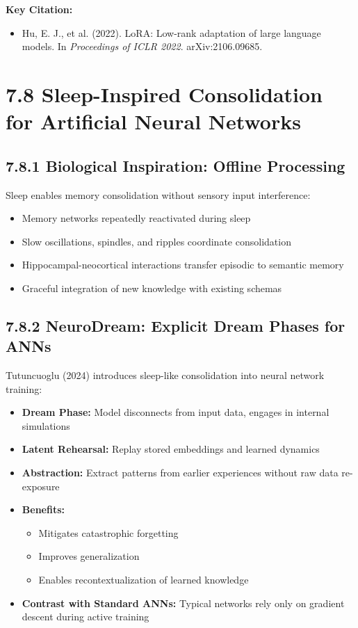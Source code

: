 \documentclass[11pt,letterpaper]{article}
\begin{document}
\textbf{Key Citation:}
\begin{itemize}[leftmargin=*]
    \item Hu, E. J., et al. (2022). LoRA: Low-rank adaptation of large language models. In \textit{Proceedings of ICLR 2022}. arXiv:2106.09685.
\end{itemize}

\section{\color{garnet}7.8 Sleep-Inspired Consolidation for Artificial Neural Networks}

\subsection{7.8.1 Biological Inspiration: Offline Processing}

Sleep enables memory consolidation without sensory input interference:

\begin{itemize}[leftmargin=*]
    \item Memory networks repeatedly reactivated during sleep
    \item Slow oscillations, spindles, and ripples coordinate consolidation
    \item Hippocampal-neocortical interactions transfer episodic to semantic memory
    \item Graceful integration of new knowledge with existing schemas
\end{itemize}

\subsection{7.8.2 NeuroDream: Explicit Dream Phases for ANNs}

Tutuncuoglu (2024) introduces sleep-like consolidation into neural network training:

\begin{itemize}[leftmargin=*]
    \item \textbf{Dream Phase:} Model disconnects from input data, engages in internal simulations
    \item \textbf{Latent Rehearsal:} Replay stored embeddings and learned dynamics
    \item \textbf{Abstraction:} Extract patterns from earlier experiences without raw data re-exposure
    \item \textbf{Benefits:}
    \begin{itemize}
        \item Mitigates catastrophic forgetting
        \item Improves generalization
        \item Enables recontextualization of learned knowledge
    \end{itemize}
    \item \textbf{Contrast with Standard ANNs:} Typical networks rely only on gradient descent during active training
\end{itemize}
\end{document}
